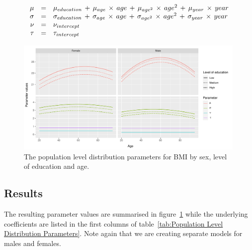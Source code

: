 \documentclass{imammb}
\numberwithin{equation}{section}
\begin{document}
\vspace{-1mm}

\begin{equation}
\label{eq:Population Level Distribution Parameters}
\begin{array}{@{\ }rcl@{\ }}
\mu & = & \mu_{education} \, + \, \mu_{age} \, \times \, age \, + \, \mu_{age^2} \, \times \, age^2 \, + \, \mu_{year} \, \times \, year\\
\sigma & = & \sigma_{education} \, + \, \sigma_{age} \, \times \, age \, + \, \sigma_{age^2} \, \times \, age^2 \, + \, \sigma_{year} \, \times \, year \\
\nu & = & \nu_{intercept}\\
\tau & = & \tau_{intercept}
\end{array}
\end{equation}

\vspace{-3mm}

\begin{figure}[!h]
\centering
\includegraphics[width=0.99\textwidth] {"Figures/Population-Level-Distribution-Parameters.pdf"}
\caption{The population level distribution parameters for BMI by sex, level of education and age.}
\label{fig:Population Level Distribution Parameters}
\vspace*{-9pt}
\end{figure}

\subsection{Results}
\label{sec:Population Level Distribution/Results}

The resulting parameter values are summarised in figure~\ref{fig:Population Level Distribution Parameters} while the underlying coefficients are listed in the first columns of table~\ref{tab:Population Level Distribution Parameters}. Note again that we are creating separate models for males and females.
\end{document}
